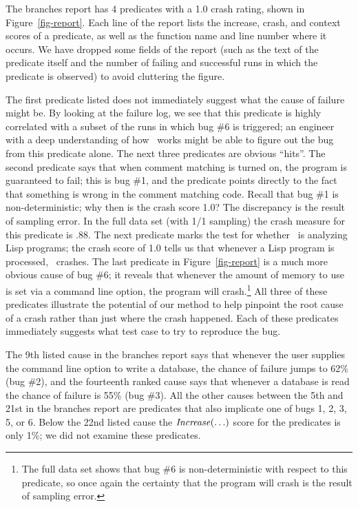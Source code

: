 The branches report has 4 predicates with a 1.0 crash rating, shown in
Figure~\ref{fig-report}.  Each line of the report lists the increase,
crash, and context scores of a predicate, as well as the function name
and line number where it occurs.  We have dropped some fields of the
report (such as the text of the predicate itself and the number of
failing and successful runs in which the predicate is observed) to
avoid cluttering the figure.

The first predicate listed does not immediately suggest what the cause
of failure might be. By looking at the failure log, we see that this predicate
is highly correlated with a subset of the runs in which bug \#6 is
triggered; an engineer with a deep understanding of how \moss\ works
might be able to figure out the bug from this predicate alone.
The next three predicates are obvious ``hits''. The second predicate
says that when comment matching is turned on, the program is
guaranteed to fail; this is bug \#1, and the predicate points directly
to the fact that something is wrong in the comment matching code.
Recall that bug \#1 is non-deterministic; why then is the crash score 1.0?
The discrepancy is the result of sampling error.  In the full data set
(with 1/1 sampling) the crash measure for this predicate is .88.  The
next predicate marks the test for whether \moss\ is analyzing Lisp
programs; the crash score of 1.0 tells us that whenever a Lisp program is
processed, \moss\ crashes.  The last predicate in
Figure~\ref{fig-report} is a much more obvious cause of 
bug \#6; it reveals that whenever the amount of memory to use is set
via a command line option, the program will crash.\footnote{The full data set shows that bug \#6 is non-deterministic with respect to this predicate, so once again the certainty that the program will crash is the result of sampling error.}  All three of these predicates illustrate the potential of our method to
help pinpoint the root cause of a crash rather than just where the crash
happened.  Each of these predicates immediately suggests
what test case to try to reproduce the bug. 

The 9th listed cause in the branches report says that whenever the
user supplies the command line option to write a database, the chance
of failure jumps to 62\% (bug \#2), and the fourteenth ranked cause
says that whenever a database is read the chance of failure is 55\%
(bug \#3).  All the other causes between the 5th and 21st in the branches report are predicates that also implicate one of bugs 1, 2, 3, 5, or 6.  Below
the 22nd listed cause the $\mbox{\textit{Increase}}(\ldots)$ score for the predicates is
only 1\%; we did not examine these predicates.

